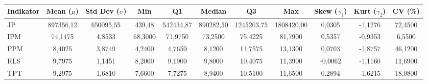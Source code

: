 \begin{adjustbox}{max width=\textwidth}
\small
\begin{tabular}{|>{\centering\arraybackslash}p{2.5cm}|c|c|c|c|c|c|c|c|c|c|}
\hline
\textbf{Indikator} & \textbf{Mean ($\mu$)} & \textbf{Std Dev ($\sigma$)} & \textbf{Min} & \textbf{Q1} & \textbf{Median} & \textbf{Q3} & \textbf{Max} & \textbf{Skew ($\gamma_1$)} & \textbf{Kurt ($\gamma_2$)} & \textbf{CV (\%)} \\
\hline
JP & 897356,12 & 650095,55 & 439,48 & 542434,87 & 890282,50 & 1245203,75 & 1808420,00 & 0,0305 & -1,1276 & 72,4500 \\
IPM & 74,1475 & 4,8533 & 68,3000 & 71,9750 & 73,2500 & 75,4225 & 81,7900 & 0,5357 & -0,9353 & 6,5500 \\
PPM & 8,4025 & 3,8749 & 4,2400 & 4,7650 & 8,1200 & 11,7575 & 13,1300 & 0,0703 & -1,8757 & 46,1200 \\
RLS & 9,7975 & 1,1451 & 8,2000 & 9,1900 & 9,8000 & 10,4075 & 11,3900 & -0,0062 & -1,1160 & 11,6900 \\
TPT & 9,2975 & 1,6810 & 7,6600 & 7,7275 & 8,9400 & 10,5100 & 11,6500 & 0,2894 & -1,6215 & 18,0800 \\
\hline
\end{tabular}
\end{adjustbox}
